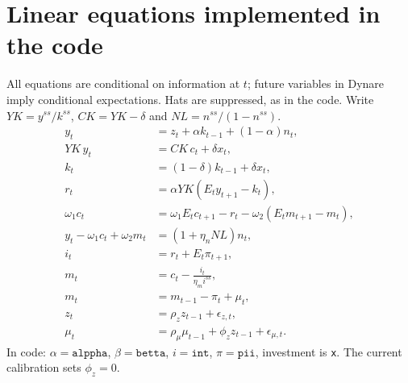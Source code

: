 \documentclass[11pt,a4paper]{article}
\begin{document}
\section*{Linear equations implemented in the code}
All equations are conditional on information at $t$; future variables in
Dynare imply conditional expectations. Hats are suppressed, as in the code.
Write $YK=y^{ss}/k^{ss}$, $CK=YK-\delta$ and $NL=n^{ss}/(1-n^{ss})$.
\begin{align*}
y_t&=z_t+\alpha k_{t-1}+(1-\alpha)n_t,\\
YK\,y_t&=CK\,c_t+\delta x_t,\\
k_t&=(1-\delta)k_{t-1}+\delta x_t,\\
r_t&=\alpha YK(E_ty_{t+1}-k_t),\\
\omega_1c_t&=\omega_1E_tc_{t+1}-r_t-\omega_2(E_tm_{t+1}-m_t),\\
y_t-\omega_1c_t+\omega_2m_t&=(1+\eta_n NL)n_t,\\
i_t&=r_t+E_t\pi_{t+1},\\
m_t&=c_t-\frac{i_t}{\eta_m i^{ss}},\\
m_t&=m_{t-1}-\pi_t+\mu_t,\\
z_t&=\rho_z z_{t-1}+\epsilon_{z,t},\\
\mu_t&=\rho_\mu\mu_{t-1}+\phi_z z_{t-1}+\epsilon_{\mu,t}.
\end{align*}
In code: $\alpha=\texttt{alppha}$, $\beta=\texttt{betta}$,
$i=\texttt{int}$, $\pi=\texttt{pii}$, investment is \texttt{x}.
The current calibration sets $\phi_z=0$.
\end{document}
